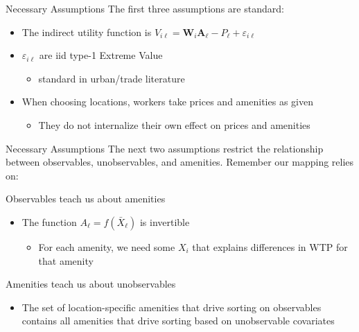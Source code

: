 \documentclass[aspectratio=169,t]{beamer}
\begin{document}
\begin{frame}{Necessary Assumptions}
  The first three assumptions are standard:

  \begin{itemize}
    \item[\color{blue} A1] The indirect utility function is $V_{i \ell} = \bm{W}_i \bm{A}_\ell - {P}_\ell + \varepsilon_{i \ell}$
    
    \medskip
    \item[\color{blue} A2] $\varepsilon_{i \ell}$ are iid type-1 Extreme Value 
    \begin{itemize}
      \item standard in urban/trade literature
    \end{itemize}
    
    \medskip
    \item[\color{blue} A3] When choosing locations, workers take prices and amenities as given 
    \begin{itemize}
      \item They do not internalize their own effect on prices and amenities
    \end{itemize}
  \end{itemize}
\end{frame}


\begin{frame}{Necessary Assumptions}
  The next two assumptions restrict the relationship between observables, unobservables, and amenities. Remember our mapping relies on:

  \bigskip
  Observables teach us about amenities
  \begin{itemize}
    \item[\color{blue} A4] The function $A_\ell = f(\bar{X}_{\ell})$ is invertible
    \begin{itemize}
      \item For each amenity, we need some $X_i$ that explains differences in WTP for that amenity
    \end{itemize}
  \end{itemize}

  \pause
  \bigskip
  Amenities teach us about unobservables
  \begin{itemize}
    \item[\color{blue} A5] The set of location-specific amenities that drive sorting on observables contains all amenities that drive sorting based on unobservable covariates
  \end{itemize}
\end{frame}
\end{document}

